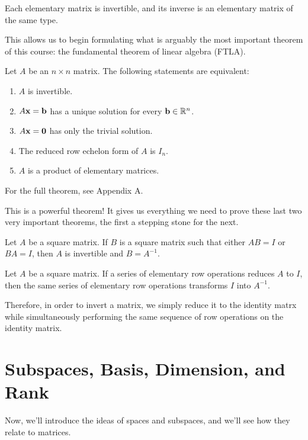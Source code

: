 \documentclass[../m73main.tex]{subfiles}
\begin{document}
\begin{theorem}
	Each elementary matrix is invertible, and its inverse is an elementary matrix of the same type.
\end{theorem}

This allows us to begin formulating what is arguably the most important theorem of this course: the fundamental theorem of linear algebra (FTLA).

\begin{theorem}
	Let $A$ be an $n\times n$ matrix.
	The following statements are equivalent:
	\begin{enumerate}[label=(\alph*)]
		\item $A$ is invertible.
		\item $A\mathbf{x}= \mathbf{b}$ has a unique solution for every $\mathbf{b}\in\mathbb{R}^n$.
		\item $A\mathbf{x}=\mathbf{0}$ has only the trivial solution.
		\item The reduced row echelon form of $A$ is $I_n$.
		\item $A$ is a product of elementary matrices.
	\end{enumerate}
	For the full theorem, see Appendix A.
\end{theorem}

This is a powerful theorem!
It gives us everything we need to prove these last two very important theorems, the first a stepping stone for the next.

\begin{theorem}
	Let $A$ be a square matrix.
	If $B$ is a square matrix such that either $AB = I$ or $BA = I$, then $A$ is invertible and $B = A^{-1}$.
\end{theorem}

\begin{theorem}
	Let $A$ be a square matrix.
	If a series of elementary row operations reduces $A$ to $I$, then the same series of elementary row operations transforms $I$ into $A^{-1}$.
\end{theorem}

Therefore, in order to invert a matrix, we simply reduce it to the identity matrx while simultaneously performing the same sequence of row operations on the identity matrix.

\section{Subspaces, Basis, Dimension, and Rank}
Now, we'll introduce the ideas of spaces and subspaces, and we'll see how they relate to matrices.
\end{document}
